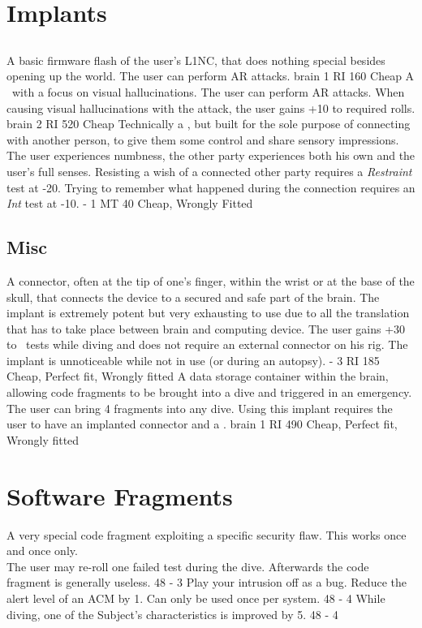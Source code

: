 \section{Implants}
\subsection{\modifiedlincname}
	{A basic firmware flash of the user's L1NC, that does nothing special besides opening up the world.}
	{The user can perform AR attacks.}
	{brain}
	{1 RI}
	{160}
	{Cheap}
	{A \modifiedlincname\ with a focus on visual hallucinations.}
	{The user can perform AR attacks.
		When causing visual hallucinations with the attack, the user gains +10 to required rolls.}
	{brain}
	{2 RI}
	{520}
	{Cheap}
	{Technically a \modifiedlincname, but built for the sole purpose of connecting with another person, to give them some control and share sensory impressions.
		The user experiences numbness, the other party experiences both his own and the user's full senses.
	}
	{Resisting a wish of a connected other party requires a \emph{Restraint} test at -20.
		Trying to remember what happened during the connection requires an \emph{Int} test at -10.}
	{-}
	{1 MT}
	{40}
	{Cheap, Wrongly Fitted}
\subsection{Misc}
	{
		A connector, often at the tip of one's finger,
		within the wrist or at the base of the skull,
		that connects the device to a secured and safe part of the brain.
		The implant is extremely potent but very exhausting to use due to all the translation that has to take place between brain and computing device.}
	{The user gains +30 to \hackingskill\ tests while diving and does not require an external connector on his rig.
		The implant is unnoticeable while not in use (or during an autopsy).}
	{-}
	{3 RI}
	{185}
	{Cheap, Perfect fit, Wrongly fitted}
	{A data storage container within the brain, allowing code fragments to be brought into a dive and triggered in an emergency.}
	{The user can bring 4 fragments into any dive.
		Using this implant requires the user to have an implanted connector and a \modifiedlincname.}
	{brain}
	{1 RI}
	{490}
	{Cheap, Perfect fit, Wrongly fitted}

\section{Software Fragments}
	{A very special code fragment exploiting a specific security flaw.
		This works once and once only.
		\\%
		The user may re-roll one failed test during the dive.
		Afterwards the code fragment is generally useless.}
	{48}
	{-}
	{3}
{Play your intrusion off as a bug.
	Reduce the alert level of an ACM by 1.
	Can only be used once per system.}
{48}
{-}
	{4}
	{While diving, one of the Subject's characteristics is improved by 5.}
	{48}
	{-}
	{4}
